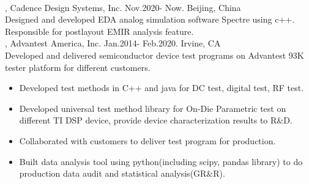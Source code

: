 \documentclass[11pt]{article} %
\begin{document}
\\
, Cadence Design Systems, Inc. Nov.2020- Now.  Beijing, China\\
\noindent Designed and developed EDA analog simulation software Spectre using c++. Responsible for postlayout EMIR analysis feature.\\
, Advantest America, Inc. Jan.2014- Feb.2020. Irvine, CA\\
\noindent Developed and delivered semiconductor device test programs on Advantest 93K tester platform for different customers.\\ 
\begin{itemize}  
    \item Developed test methods in C++ and java for DC test, digital test, RF test.\\
 \vspace{-4mm}
    \item  Developed universal test method library for On-Die Parametric test on different TI DSP device, provide device characterization results to R\&D.\\ 
 \vspace{-4mm}
  \item Collaborated with customers to deliver test program for production.\\
 \vspace{-4mm}
  \item Built data analysis tool using python(including scipy, pandas library) to do production data audit and statistical analysis(GR\&R).\\ 
 \end{itemize}
\end{document}
